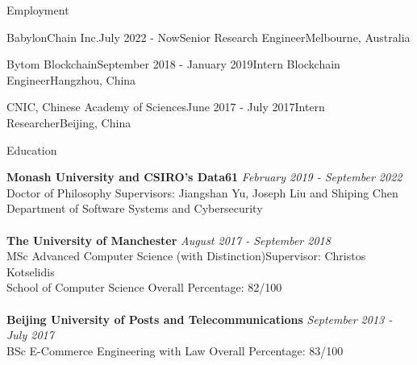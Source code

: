 \documentclass{resume} %
\begin{document}
\begin{rSection}{Employment}
    \begin{rSubsubsection}{BabylonChain Inc.}{July 2022 - Now}{Senior Research Engineer}{Melbourne, Australia}
    \end{rSubsubsection}

    \begin{rSubsubsection}{Bytom Blockchain}{September 2018 - January 2019}{Intern Blockchain Engineer}{Hangzhou, China}
    \end{rSubsubsection}

    \begin{rSubsubsection}{CNIC, Chinese Academy of Sciences}{June 2017 - July 2017}{Intern Researcher}{Beijing, China}
    \end{rSubsubsection}
\end{rSection}

\begin{rSection}{Education}

    {\bf Monash University and CSIRO's Data61} \hfill {\em February 2019 - September 2022}
    \\ Doctor of Philosophy\hfill { Supervisors: Jiangshan Yu, Joseph Liu and Shiping Chen}
    \\ Department of Software Systems and Cybersecurity\\
    \\{\bf The University of Manchester} \hfill {\em August 2017 - September 2018}
    \\ MSc Advanced Computer Science (with Distinction)\hfill {Supervisor: Christos Kotselidis}
    \\ School of Computer Science\hfill { Overall Percentage: 82/100 }\\
    \\{\bf Beijing University of Posts and Telecommunications} \hfill {\em September 2013 - July 2017}
    \\ BSc E-Commerce Engineering with Law\hfill { Overall Percentage: 83/100 }

\end{rSection}
\end{document}
